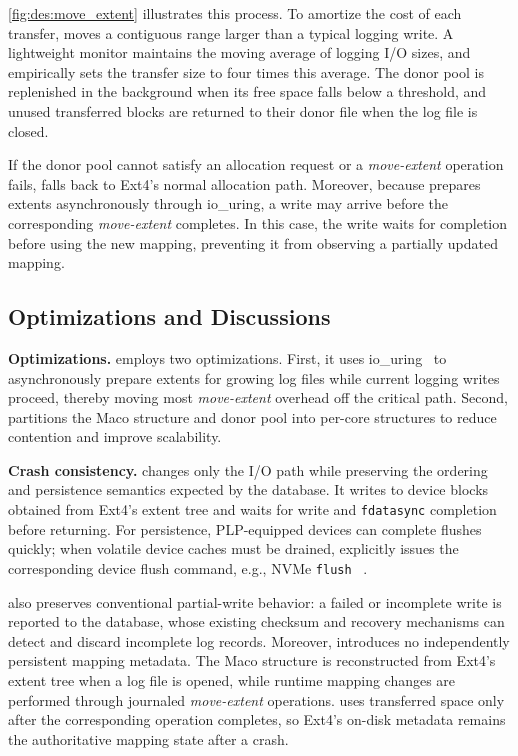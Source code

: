 \autoref{fig:des:move_extent} illustrates this process.
To amortize the cost of each transfer, \odes moves a contiguous range larger
than a typical logging write. A lightweight monitor maintains the moving
average of logging I/O sizes, and \odes empirically sets the transfer size to
four times this average. The donor pool is replenished in the background
when its free space falls below a threshold, and unused transferred blocks
are returned to their donor file when the log file is closed.

If the donor pool cannot satisfy an allocation request or a \emph{move-extent} operation fails, \odes falls back to Ext4's normal allocation path. Moreover, because \odes prepares extents asynchronously
through io\_uring, a write may arrive before the corresponding
\emph{move-extent} completes. In this case, the write waits for completion
before using the new mapping, preventing it from observing a partially
updated mapping.


\subsection{Optimizations and Discussions}
\label{sec:design:discussion}

\textbf{Optimizations.}
\odes employs two optimizations.
First, it uses io\_uring~\cite{iouring,ioctlWik84:online} to asynchronously
prepare extents for growing log files while current logging writes proceed,
thereby moving most \emph{move-extent} overhead off the critical path.
Second, \odes partitions the Maco structure and donor pool into per-core
structures to reduce contention and improve scalability.

\textbf{Crash consistency.}
\odes changes only the I/O path while preserving the ordering and persistence
semantics expected by the database. It writes to device blocks obtained from
Ext4's extent tree and waits for write and \texttt{fdatasync} completion
before returning. For persistence, PLP-equipped devices can complete flushes
quickly; when volatile device caches must be drained, \odes explicitly issues
the corresponding device flush command, e.g., NVMe \texttt{flush}
~\cite{fsync:bio-flags}.

\odes also preserves conventional partial-write behavior: a failed or
incomplete write is reported to the database, whose existing checksum and
recovery mechanisms can detect and discard incomplete log records.
Moreover, \odes introduces no independently persistent mapping metadata.
The Maco structure is reconstructed from Ext4's extent tree when a log file
is opened, while runtime mapping changes are performed through journaled
\emph{move-extent} operations. \odes uses transferred space only after the
corresponding operation completes, so Ext4's on-disk metadata remains the
authoritative mapping state after a crash.

